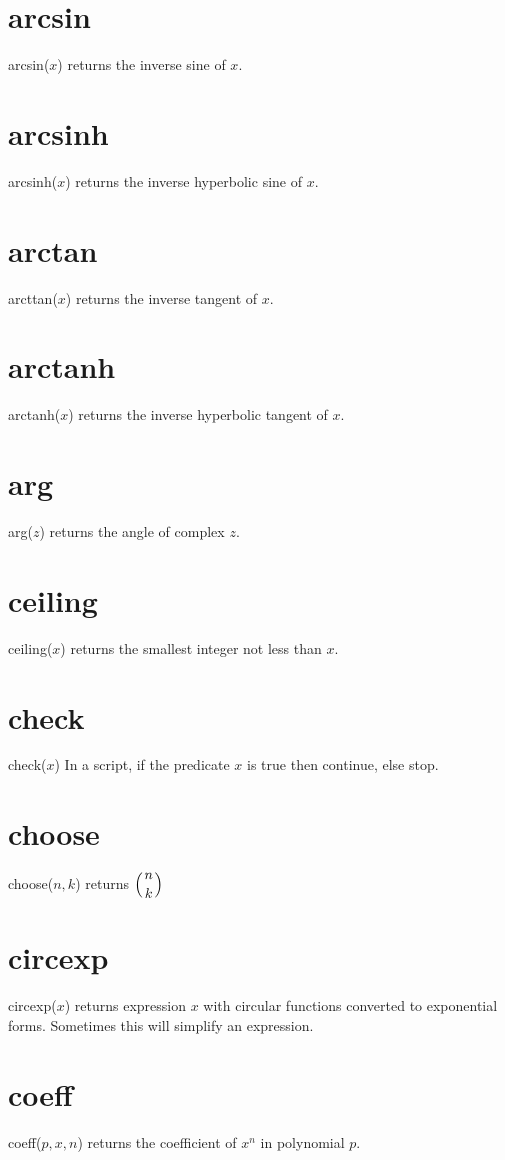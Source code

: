 \documentclass[12pt,openany]{report}
\begin{document}
\section*{arcsin}
arcsin($x$) returns the inverse sine of $x$.

\section*{arcsinh}
arcsinh($x$) returns the inverse hyperbolic sine of $x$.

\section*{arctan}
arcttan($x$) returns the inverse tangent of $x$.

\section*{arctanh}
arctanh($x$) returns the inverse hyperbolic tangent of $x$.

\section*{arg}
arg($z$) returns the angle of complex $z$.

\section*{ceiling}
ceiling($x$) returns the smallest integer not less than $x$.

\section*{check}
check($x$) In a script, if the predicate $x$ is true then continue, else stop.

\section*{choose}
choose($n,k$) returns $\displaystyle\left({n \atop k}\right)$

\section*{circexp}
circexp($x$) returns expression $x$ with circular functions converted
to exponential forms.
Sometimes this will simplify an expression.

\section*{coeff}
coeff($p,x,n$) returns the coefficient of $x^n$ in polynomial $p$.
\end{document}
